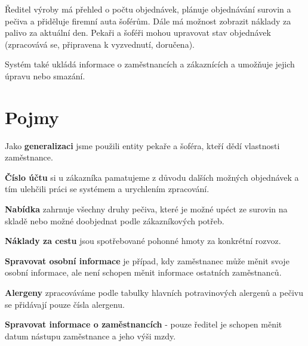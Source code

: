 \documentclass[a4paper, 12pt]{article}
\begin{document}
Ředitel výroby má přehled o počtu objednávek, plánuje objednávání surovin a pečiva a přiděluje firemní auta šoférům. Dále má možnost zobrazit náklady za palivo za aktuální den. Pekaři a šoféři mohou upravovat stav objednávek (zpracovává se, připravena k vyzvednutí, doručena).

Systém také ukládá informace o zaměstnancích a zákaznících a umožňuje jejich úpravu nebo smazání.

\section{Pojmy}
\begin{description}
   \item Jako \textbf{generalizaci} jsme použili entity pekaře a šoféra, kteří dědí vlastnosti zaměstnance.
   \item \textbf{Číslo účtu} si u zákazníka pamatujeme z důvodu dalších možných objednávek a tím ulehčili práci se systémem a urychlením zpracování.
   \item \textbf{Nabídka} zahrnuje všechny druhy pečiva, které je možné upéct ze surovin na skladě nebo
možné doobjednat podle zákazníkových potřeb.
    \item \textbf{Náklady za cestu} jsou spotřebované pohonné hmoty za konkrétní rozvoz.
    \item \textbf{Spravovat osobní informace} je případ, kdy zaměstnanec může měnit svoje osobní
informace, ale není schopen měnit informace ostatních zaměstnanců.
    \item \textbf{Alergeny} zpracováváme podle tabulky hlavních potravinových alergenů a pečivu se přidávají
pouze čísla alergenu.
    \item \textbf{Spravovat informace o zaměstnancích} - pouze ředitel je schopen měnit datum nástupu zaměstnance a jeho výši mzdy. 
\end{description}

\end{document}
